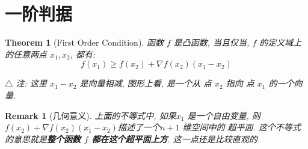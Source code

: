 \documentclass{article}
\newtheorem{theorem}{Theorem}
\newtheorem{remark}{Remark}
\begin{document}
\section{一阶判据}
\begin{theorem}[First Order Condition]
  函数 $f$ 是凸函数, 当且仅当, $f$ 的定义域上的任意两点 $x_1, x_2$, 都有:
  \[f(x_1) \geq f(x_2) + \nabla f(x_2)(x_1 - x_2)\]

  $\triangle$ 注: 这里 $x_1 - x_2$ 是向量相减, 图形上看, 是一个从 点 $x_2$ 指向 点 $x_1$ 的一个向量.
\end{theorem}
\begin{remark}[几何意义]
  上面的不等式中, 如果$x_1$ 是一个自由变量, 则$f(x_2) + \nabla f(x_2) (x_1 - x_2)$描述了一个$n+1$ 维空间中的 超平面.
  这个不等式的意思就是\textbf{整个函数 $f$ 都在这个超平面上方}. 这一点还是比较直观的.
\end{remark}
\end{document}
